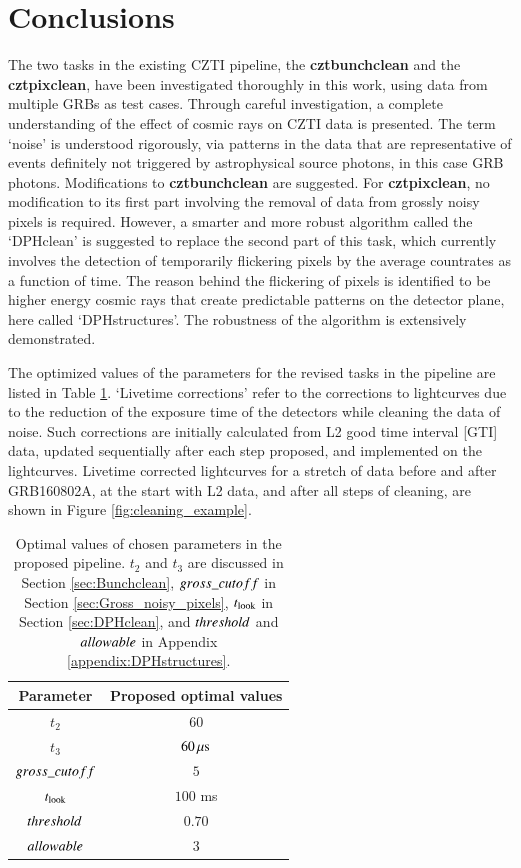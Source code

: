 \section{Conclusions}
\label{sec:conclusions--noise}
The two tasks in the existing CZTI pipeline, the \textbf{cztbunchclean} and the \textbf{cztpixclean}, have been investigated thoroughly in this work, using data from multiple GRBs as test cases. Through careful investigation, a complete understanding of the effect of cosmic rays on CZTI data is presented. The term `noise' is understood rigorously, via patterns in the data that are representative of events definitely not triggered by astrophysical source photons, in this case GRB photons. Modifications to \textbf{cztbunchclean} are suggested. For \textbf{cztpixclean}, no modification to its first part involving the removal of data from grossly noisy pixels is required. However, a smarter and more robust algorithm called the `DPHclean' is suggested to replace the second part of this task, which currently involves the detection of temporarily flickering pixels by the average countrates as a function of time. The reason behind the flickering of pixels is identified to be higher energy cosmic rays that create predictable patterns on the detector plane, here called `DPHstructures'. The robustness of the algorithm is extensively demonstrated.

The optimized values of the parameters for the revised tasks in the pipeline are listed in Table \ref{tab:parameters}. `Livetime corrections' refer to the corrections to lightcurves due to the reduction of the exposure time of the detectors while cleaning the data of noise. Such corrections are initially calculated from L2 good time interval [GTI] data, updated sequentially after each step proposed, and implemented on the lightcurves. Livetime corrected lightcurves for a stretch of data before and after GRB160802A, at the start with L2 data, and after all steps of cleaning, are shown in Figure \ref{fig:cleaning_example}.%


\begin{table}
\caption[Optimal values of the parameters in the improved pipeline]{Optimal values of chosen parameters in the proposed pipeline. $t_2$ and $t_3$ are discussed in Section \ref{sec:Bunchclean}, $gross\_cutoff$ in Section \ref{sec:Gross_noisy_pixels}, $t_{{\rm look}}$ in Section \ref{sec:DPHclean}, and $threshold$ and $allowable$ in Appendix \ref{appendix:DPHstructures}.}
\label{tab:parameters}
\begin{center}
\begin{tabular}{|c|c|}
\hline 
Parameter & Proposed optimal values\\
\hline 
\hline 
$t_{2}$ & $60$ \\
\hline 
$t_{3}$ & $60 \, {\rm \mu s}$\\
\hline 
$gross\_cutoff$ & $5$\\
\hline 
$t_{{\rm look}}$ & $100$ ms\\
\hline 
$threshold$ & $0.70$\\
\hline 
$allowable$ & $3$\\
\hline 
\end{tabular}
\end{center}
\end{table}


